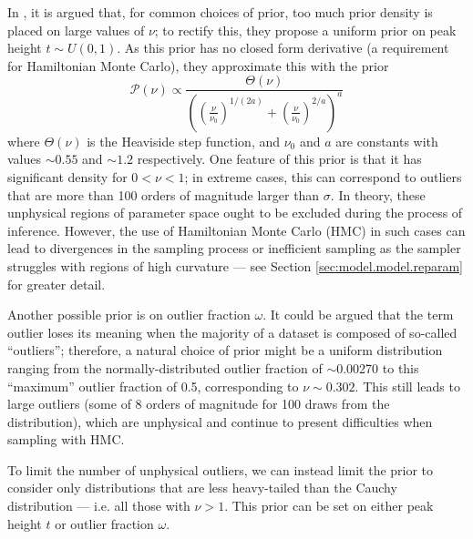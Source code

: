 \documentclass[fleqn,usenatbib]{mnras}
\begin{document}
In \citet{Feeney:2018}, it is argued that, for common choices of prior, too
much prior density is placed on large values of $\nu$; to rectify this, they
propose a uniform prior on peak height $t \sim U\left(0, 1\right)$. As this
prior has no closed form derivative (a requirement for Hamiltonian Monte Carlo),
they approximate this with the prior
\begin{equation}
    \mathcal P\left(\nu\right) \propto
    \frac{
        \Theta(\nu)
    }{
        \left(
            \left(\frac{\nu}{\nu_0}\right)^{1 / (2 a)}
            + \left(\frac{\nu}{\nu_0}\right)^{2 / a}
        \right)^a
    }
\end{equation}
where $\Theta(\nu)$ is the Heaviside step function, and $\nu_0$ and $a$ are
constants with values $\sim 0.55$ and $\sim 1.2$ respectively.  One feature of
this prior is that it has significant density for $0 < \nu < 1$; in extreme
cases, this can correspond to outliers that are more than 100 orders of
magnitude larger than $\sigma$. In theory, these unphysical regions of parameter
space ought to be excluded during the process of inference. However, the use of
Hamiltonian Monte Carlo (HMC) in such cases can lead to divergences in the
sampling process or inefficient sampling as the sampler struggles with regions
of high curvature --- see Section \ref{sec:model.model.reparam} for greater
detail.

Another possible prior is on outlier fraction $\omega$. It could be argued that
the term outlier loses its meaning when the majority of a dataset is composed of
so-called ``outliers''; therefore, a natural choice of prior might be a uniform
distribution ranging from the normally-distributed outlier fraction of
$\sim$0.00270 to this ``maximum'' outlier fraction of 0.5, corresponding to $\nu
\sim 0.302$. This still leads to large outliers (some of 8 orders of magnitude
for 100 draws from the distribution), which are unphysical and continue to
present difficulties when sampling with HMC.

To limit the number of unphysical outliers, we can instead limit the prior to
consider only distributions that are less heavy-tailed than the Cauchy
distribution --- i.e. all those with $\nu > 1$. This prior can be set on either
peak height $t$ or outlier fraction $\omega$.

\end{document}
